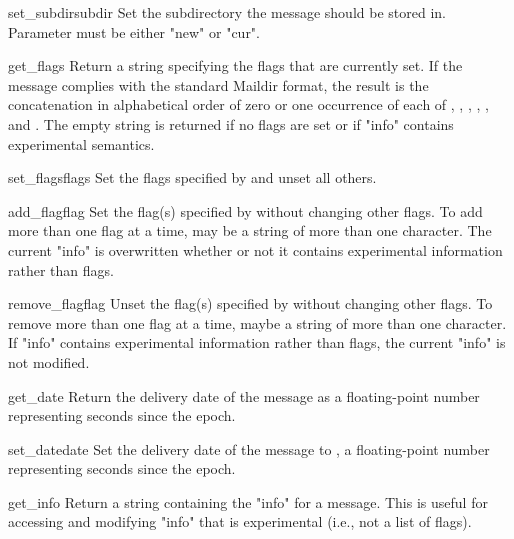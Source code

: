 \begin{methoddesc}{set_subdir}{subdir}
Set the subdirectory the message should be stored in. Parameter 
must be either "new" or "cur".
\end{methoddesc}

\begin{methoddesc}{get_flags}{}
Return a string specifying the flags that are currently set. If the message
complies with the standard Maildir format, the result is the concatenation in
alphabetical order of zero or one occurrence of each of ,
, , , , and .
The empty string is returned if no flags are set or if "info" contains
experimental semantics.
\end{methoddesc}

\begin{methoddesc}{set_flags}{flags}
Set the flags specified by  and unset all others.
\end{methoddesc}

\begin{methoddesc}{add_flag}{flag}
Set the flag(s) specified by  without changing other flags. To add
more than one flag at a time,  may be a string of more than one
character. The current "info" is overwritten whether or not it contains
experimental information rather than
flags.
\end{methoddesc}

\begin{methoddesc}{remove_flag}{flag}
Unset the flag(s) specified by  without changing other flags. To
remove more than one flag at a time,  maybe a string of more than one
character. If "info" contains experimental information rather than flags, the
current "info" is not modified.
\end{methoddesc}

\begin{methoddesc}{get_date}{}
Return the delivery date of the message as a floating-point number representing
seconds since the epoch.
\end{methoddesc}

\begin{methoddesc}{set_date}{date}
Set the delivery date of the message to , a floating-point number
representing seconds since the epoch.
\end{methoddesc}

\begin{methoddesc}{get_info}{}
Return a string containing the "info" for a message. This is useful for
accessing and modifying "info" that is experimental (i.e., not a list of
flags).
\end{methoddesc}

